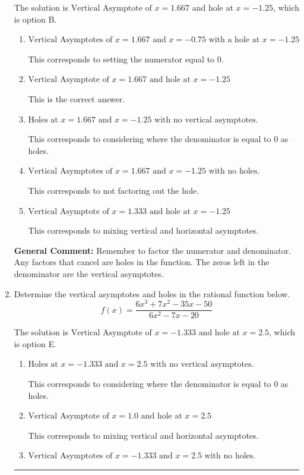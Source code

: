 \documentclass{extbook}[14pt]
\newcommand{\litem}[1]{\item #1

\rule{\textwidth}{0.4pt}}
\begin{document}
\begin{enumerate}
{The solution is \( \text{Vertical Asymptote of } x = 1.667 \text{ and hole at } x = -1.25 \), which is option B.\begin{enumerate}[label=\Alph*.]
\item \( \text{Vertical Asymptotes of } x = 1.667 \text{ and } x = -0.75 \text{ with a hole at } x = -1.25 \)

This corresponds to setting the numerator equal to 0.
\item \( \text{Vertical Asymptote of } x = 1.667 \text{ and hole at } x = -1.25 \)

This is the correct answer.
\item \( \text{Holes at } x = 1.667 \text{ and } x = -1.25 \text{ with no vertical asymptotes.} \)

This corresponds to considering where the denominator is equal to 0 as holes.
\item \( \text{Vertical Asymptotes of } x = 1.667 \text{ and } x = -1.25 \text{ with no holes.} \)

This corresponds to not factoring out the hole.
\item \( \text{Vertical Asymptote of } x = 1.333 \text{ and hole at } x = -1.25 \)

This corresponds to mixing vertical and horizontal asymptotes.
\end{enumerate}

\textbf{General Comment:} Remember to factor the numerator and denominator. Any factors that cancel are holes in the function. The zeros left in the denominator are the vertical asymptotes.
}
\litem{
Determine the vertical asymptotes and holes in the rational function below.
\[ f(x) = \frac{6x^{3} +7 x^{2} -35 x -50}{6x^{2} -7 x -20} \]

The solution is \( \text{Vertical Asymptote of } x = -1.333 \text{ and hole at } x = 2.5 \), which is option E.\begin{enumerate}[label=\Alph*.]
\item \( \text{Holes at } x = -1.333 \text{ and } x = 2.5 \text{ with no vertical asymptotes.} \)

This corresponds to considering where the denominator is equal to 0 as holes.
\item \( \text{Vertical Asymptote of } x = 1.0 \text{ and hole at } x = 2.5 \)

This corresponds to mixing vertical and horizontal asymptotes.
\item \( \text{Vertical Asymptotes of } x = -1.333 \text{ and } x = 2.5 \text{ with no holes.} \)


\end{enumerate}}
\end{enumerate}
\end{document}
